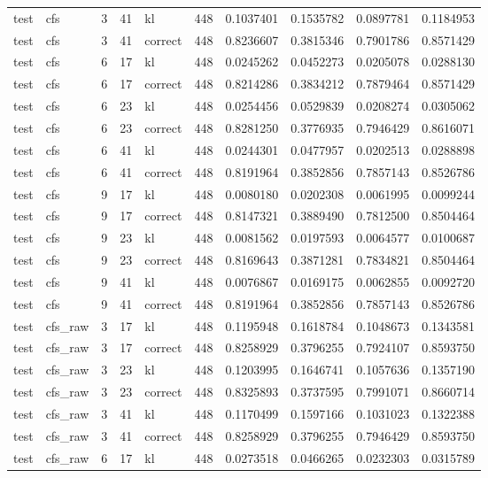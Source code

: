 \begin{tabular}{llrrlrrrrr}
test & cfs & 3 & 41 & kl & 448 & 0.1037401 & 0.1535782 & 0.0897781 & 0.1184953 \\
test & cfs & 3 & 41 & correct & 448 & 0.8236607 & 0.3815346 & 0.7901786 & 0.8571429 \\
test & cfs & 6 & 17 & kl & 448 & 0.0245262 & 0.0452273 & 0.0205078 & 0.0288130 \\
test & cfs & 6 & 17 & correct & 448 & 0.8214286 & 0.3834212 & 0.7879464 & 0.8571429 \\
test & cfs & 6 & 23 & kl & 448 & 0.0254456 & 0.0529839 & 0.0208274 & 0.0305062 \\
test & cfs & 6 & 23 & correct & 448 & 0.8281250 & 0.3776935 & 0.7946429 & 0.8616071 \\
test & cfs & 6 & 41 & kl & 448 & 0.0244301 & 0.0477957 & 0.0202513 & 0.0288898 \\
test & cfs & 6 & 41 & correct & 448 & 0.8191964 & 0.3852856 & 0.7857143 & 0.8526786 \\
test & cfs & 9 & 17 & kl & 448 & 0.0080180 & 0.0202308 & 0.0061995 & 0.0099244 \\
test & cfs & 9 & 17 & correct & 448 & 0.8147321 & 0.3889490 & 0.7812500 & 0.8504464 \\
test & cfs & 9 & 23 & kl & 448 & 0.0081562 & 0.0197593 & 0.0064577 & 0.0100687 \\
test & cfs & 9 & 23 & correct & 448 & 0.8169643 & 0.3871281 & 0.7834821 & 0.8504464 \\
test & cfs & 9 & 41 & kl & 448 & 0.0076867 & 0.0169175 & 0.0062855 & 0.0092720 \\
test & cfs & 9 & 41 & correct & 448 & 0.8191964 & 0.3852856 & 0.7857143 & 0.8526786 \\
test & cfs_raw & 3 & 17 & kl & 448 & 0.1195948 & 0.1618784 & 0.1048673 & 0.1343581 \\
test & cfs_raw & 3 & 17 & correct & 448 & 0.8258929 & 0.3796255 & 0.7924107 & 0.8593750 \\
test & cfs_raw & 3 & 23 & kl & 448 & 0.1203995 & 0.1646741 & 0.1057636 & 0.1357190 \\
test & cfs_raw & 3 & 23 & correct & 448 & 0.8325893 & 0.3737595 & 0.7991071 & 0.8660714 \\
test & cfs_raw & 3 & 41 & kl & 448 & 0.1170499 & 0.1597166 & 0.1031023 & 0.1322388 \\
test & cfs_raw & 3 & 41 & correct & 448 & 0.8258929 & 0.3796255 & 0.7946429 & 0.8593750 \\
test & cfs_raw & 6 & 17 & kl & 448 & 0.0273518 & 0.0466265 & 0.0232303 & 0.0315789 \\

\end{tabular}
